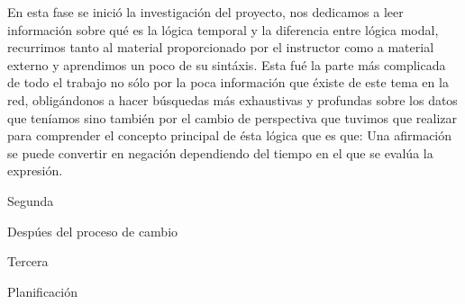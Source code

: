	En esta fase se inició la investigación del proyecto, nos dedicamos a leer información sobre qué es la lógica temporal y la diferencia entre lógica modal, recurrimos tanto al material proporcionado por el instructor como a material externo y aprendimos un poco de su sintáxis. Esta fué la parte más complicada de todo el trabajo no sólo por la poca información que éxiste de este tema en la red, obligándonos a hacer búsquedas más exhaustivas y profundas sobre los datos que teníamos sino también por el cambio de perspectiva que tuvimos que realizar para comprender el concepto principal de ésta lógica que es que: Una afirmación se puede convertir en negación dependiendo del tiempo en el que se evalúa la expresión. 
	
Segunda

Despúes del proceso de cambio

Tercera

Planificación 